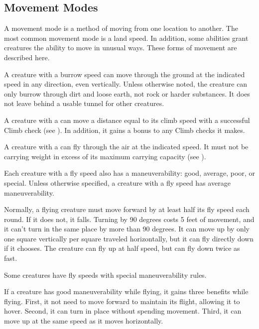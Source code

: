    \subsection{Movement Modes}\label{Movement Modes}
        A movement mode is a method of moving from one location to another.
        The most common movement mode is a land speed.
        In addition, some abilities grant creatures the ability to move in unusual ways.
        These forms of movement are described here.

        A creature with a burrow speed can move through the ground at the indicated speed in any direction, even vertically. Unless otherwise noted, the creature can only burrow through dirt and loose earth, not rock or harder substances. It does not leave behind a usable tunnel for other creatures.

        A creature with a  can move a distance equal to its climb speed with a successful Climb check (see ).
        In addition, it gains a  bonus to any Climb checks it makes.

        \label{Flying}
        A creature with a  can fly through the air at the indicated speed.
        It must not be carrying weight in excess of its maximum carrying capacity (see ).

        Each creature with a fly speed also has a maneuverability: good, average, poor, or special.
        Unless otherwise specified, a creature with a fly speed has average maneuverability.

        Normally, a flying creature must move forward by at least half its fly speed each round. If it does not, it falls.
        Turning by 90 degrees costs 5 feet of movement, and it can't turn in the same place by more than 90 degrees.
        It can move up by only one square vertically per square traveled horizontally, but it can fly directly down if it chooses.
        The creature can fly up at half speed, but can fly down twice as fast.

        \label{Maneuverability} Some creatures have fly speeds with special maneuverability rules.

         If a creature has good maneuverability while flying, it gains three benefits while flying.
        First, it not need to move forward to maintain its flight, allowing it to hover.
        Second, it can turn in place without spending movement.
        Third, it can move up at the same speed as it moves horizontally.

